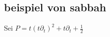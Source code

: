 % 

\subsection{beispiel von sabbah}

Sei $P=t(t\partial_t)^2+t\partial_t+\frac{1}{2}$

\begin{comment}
  \begin{enumerate}
      \item zeige $\cD/\cD\cdot P$ ist ein Meromorpher Zusammenhang.
      \item Zeichne das Newton Polygon von $P$ und finde eine formale
        Aufteilung von $\cM_{\hat{K}}$.
      \item Zeige $\cM$ kann nicht in eine direkte Summe von zwei $\cD$ modulen
        zerlegt werden, dazu:
        \begin{enumerate}
          \item Zeige das die Produktzerlegung
            \[ P=(t(t\partial_t)+v(t))\cdot(t\partial_t+u(t)) \,, \]
            mit $u,v\in\Cfu$, existiert.
          \item Berechne durch induktion die koeffizienten von $u$.
          \item Zeige dass $u \notin \C((u))$.
        \end{enumerate}
  \end{enumerate}
\end{comment}

